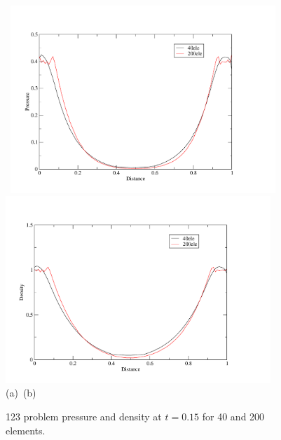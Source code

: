 \begin{figure}[H]
\vbox{
\hbox{
\hspace{-1.cm}
\includegraphics[width=10.0cm]{./doc_figures/shock/pressure-123prob}
\hspace{-1.cm}
\includegraphics[width=10.0cm]{./doc_figures/shock/density-123prob}
}
\vspace{-0.cm}
\hbox{\hspace{4.cm}(a) \hspace{4.5cm}(b)}
\vspace{-0.cm}}
\label{123-prob-pd}
\caption{ 123 problem pressure and density at $t=0.15$ for 
40 and 200 elements. }
\end{figure}


